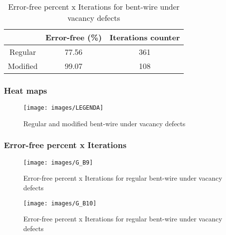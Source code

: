 \begin{table}[h]
\begin{center}
\begin{tabular}{|c|c|c|}
\hline
 & Error-free (\%) & Iterations counter \\
\hline
 Regular & 77.56 & 361 \\
\hline
 Modified & 99.07 & 108 \\
\hline

\end{tabular}
\caption{Error-free percent x Iterations for bent-wire under vacancy defects}
\end{center}
\end{table}

\pagebreak
\subsubsection{Heat maps}

\begin{figure}[h]
\center
{}
\hfill
{}
\linebreak
{\texttt{[image: images/LEGENDA]}
}
\caption{Regular and modified bent-wire under vacancy defects}
\label{figure:bentwire_t5}
\end{figure}

\subsubsection{Error-free percent x Iterations}

\begin{figure}[h!]
\center
\texttt{[image: images/G\_B9]}
\caption{Error-free percent x Iterations for regular bent-wire under vacancy defects}
\label{figure:bentwire_reg_gt5}
\end{figure}

\begin{figure}[h!]
\center
\texttt{[image: images/G\_B10]}
\caption{Error-free percent x Iterations for regular bent-wire under vacancy defects}
\label{figure:bentwire_mod_gt5}
\end{figure}
\pagebreak